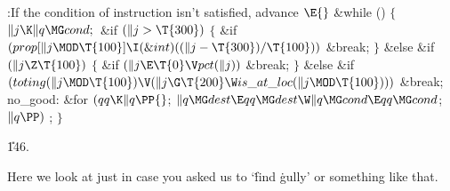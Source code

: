 \B{}:If the condition of instruction  isn't satisfied,
advance \X${}\E{}$\6
\&{while} ()\5
${}\{{}$\1\6
${}\|j\K\|q\MG\\{cond};{}$\6
\&{if} ${}(\|j>\T{300}){}$\5
${}\{{}$\1\6
\&{if} ${}(\\{prop}[\|j\MOD\T{100}]\I(\&{int})((\|j-\T{300})/\T{100})){}$\1\5
\&{break};\2\6
\4${}\}{}$\5
\2\&{else} \&{if} ${}(\|j\Z\T{100}){}$\5
${}\{{}$\1\6
\&{if} ${}(\|j\E\T{0}\V\\{pct}(\|j)){}$\1\5
\&{break};\2\6
\4${}\}{}$\5
\2\&{else} \&{if} ${}(\\{toting}(\|j\MOD\T{100})\V(\|j\G\T{200}\W\\{is\_at%
\_loc}(\|j\MOD\T{100}))){}$\1\5
\&{break};\2\6
\4\\{no\_good}:\6
\&{for} ${}(\\{qq}\K\|q\PP{}$;\6
${}\|q\MG\\{dest}\E\\{qq}\MG\\{dest}\W\|q\MG\\{cond}\E\\{qq}\MG\\{cond}{}$;\6
${}\|q\PP){}$\1\5
;\2\6
\4${}\}{}$\2\par
\U146.\fi

Here we look at  just in case you asked us to `\.{find} %
\.{gully}'
or something like that.

